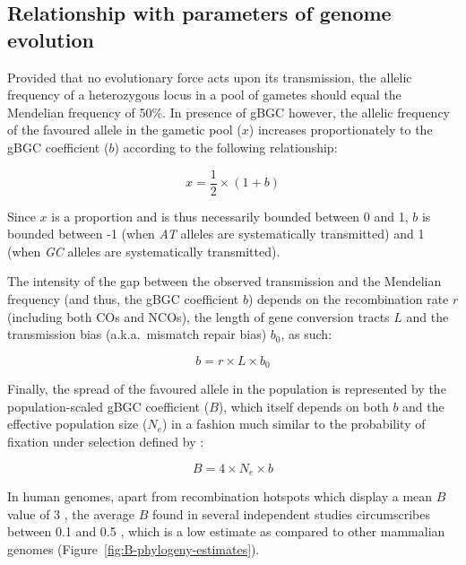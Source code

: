 \subsection{Relationship with parameters of genome evolution}

Provided that no evolutionary force acts upon its transmission, the allelic frequency of a heterozygous locus in a pool of gametes should equal the Mendelian frequency of 50\%.
In presence of gBGC however, the allelic frequency of the favoured allele in the gametic pool ($x$) increases proportionately to the gBGC coefficient ($b$) according to the following relationship:

\begin{equation*}
	x = \frac{1}{2} \times (1+b)
\end{equation*}

Since $x$ is a proportion and is thus necessarily bounded between 0 and 1, $b$ is bounded between -1 (when \textit{AT} alleles are systematically transmitted) and 1 (when \textit{GC} alleles are systematically transmitted).

The intensity of the gap between the observed transmission and the Mendelian frequency (and thus, the gBGC coefficient $b$) depends on the recombination rate $r$ (including both COs and NCOs), the length of gene conversion tracts $L$ and the transmission bias (a.k.a.\ mismatch repair bias) $b_0$, as such: 

\begin{equation*}
	b = r \times L \times b_0
\end{equation*}

Finally, the spread of the favoured allele in the population is represented by the population-scaled gBGC coefficient ($B$), which itself depends on both $b$ and the effective population size ($N_e$) in a fashion much similar to the probability of fixation under selection defined by \citet{kimura1962probability}:

\begin{equation*}
	B = 4 \times N_e \times b
\end{equation*}


In human genomes, apart from recombination hotspots which display a mean $B$ value of 3 \citep{glemin2015quantification}, the average $B$ found in several independent studies circumscribes between 0.1 and 0.5 \citep{lartillot2013phylogenetic,demaio2013linking,glemin2015quantification}, which is a low estimate as compared to other mammalian genomes \citep{lartillot2013phylogenetic} (Figure~\ref{fig:B-phylogeny-estimates}).\\


